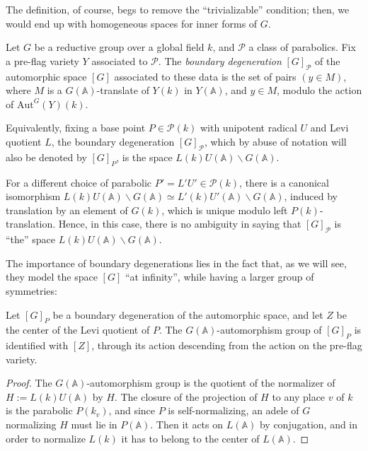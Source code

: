 The definition, of course, begs to remove the ``trivializable'' condition; then, we would end up with homogeneous spaces for inner forms of $G$.


\begin{definition}
 \label{definition-boundary-degeneration}
Let $G$ be a reductive group over a global field $k$, and $\mathcal P$ a class of parabolics. Fix a pre-flag variety $Y$ associated to $\mathcal P$.
The {\it boundary degeneration} $[G]_{\mathcal P}$ of the automorphic space $[G]$ associated to these data is the set of pairs $(y \in M)$, where $M$ is a $G(\mathbb A)$-translate of $Y(k)$ in $Y(\mathbb A)$, and $y\in M$,  modulo the action of $\text{Aut}^G(Y)(k)$. 

Equivalently, fixing a base point $P\in \mathcal P(k)$ with unipotent radical $U$ and Levi quotient $L$, the boundary degeneration $[G]_{\mathcal P}$, which by abuse of notation will also be denoted by $[G]_P$, is the space $L(k)U(\mathbb A)\backslash G(\mathbb A)$.
\end{definition}

\begin{remark}
 \label{remark-boundary-degeneration}
For a different choice of parabolic $P'= L' U'\in \mathcal P(k)$, there is a canonical isomorphism $ L(k)U(\mathbb A)\backslash G(\mathbb A) \simeq L'(k)U'(\mathbb A)\backslash G(\mathbb A)$, induced by translation by an element of $G(k)$, which is unique modulo left $P(k)$-translation. Hence, in this case, there is no ambiguity in saying that $[G]_{\mathcal P}$ is ``the'' space $L(k)U(\mathbb A)\backslash G(\mathbb A)$.
\end{remark}

The importance of boundary degenerations lies in the fact that, as we will see, they model the space $[G]$ ``at infinity'', while having a larger group of symmetries:

\begin{lemma}
 \label{lemma-boundary-automorphisms}
Let $[G]_P$ be a boundary degeneration of the automorphic space, and let $Z$ be the center of the Levi quotient of $P$. The $G(\mathbb A)$-automorphism group of $[G]_P$ is identified with $[Z]$, through its action descending from the action on the pre-flag variety.
\end{lemma}

\begin{proof}
 The $G(\mathbb A)$-automorphism group is the quotient of the normalizer of $H:=L(k)U(\mathbb A)$ by $H$. The closure of the projection of $H$ to any place $v$ of $k$ is the parabolic $P(k_v)$, and since $P$ is self-normalizing, an adele of $G$ normalizing $H$ must lie in $P(\mathbb A)$. Then it acts on $L(\mathbb A)$ by conjugation, and in order to normalize $L(k)$ it has to belong to the center of $L(\mathbb A)$. 
\end{proof}


